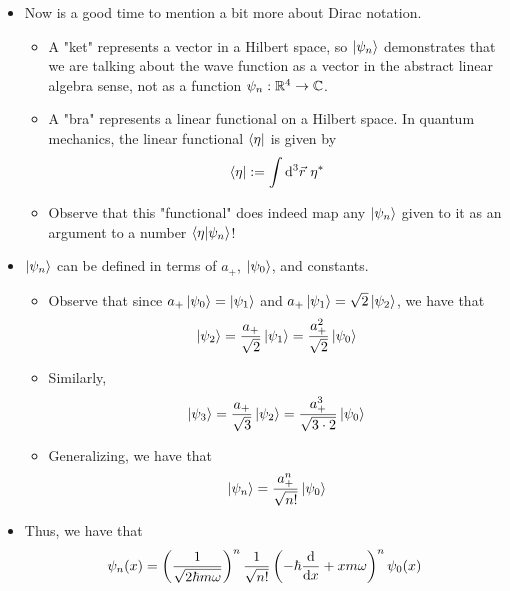 \documentclass[../notes.tex]{subfiles}
\begin{document}
\begin{itemize}
\begin{itemize}
    \end{itemize}
    \item Now is a good time to mention a bit more about Dirac notation.
    \begin{itemize}
        \item A "ket" represents a vector in a Hilbert space, so $\ket{\psi_n}$ demonstrates that we are talking about the wave function as a vector in the abstract linear algebra sense, not as a function $\psi_n:\mathbb{R}^4\to\mathbb{C}$.
        \item A "bra" represents a linear functional on a Hilbert space. In quantum mechanics, the linear functional $\bra{\eta}$ is given by
        \begin{equation*}
            \bra{\eta} := \int\dd^3\vec{r}\ \eta^*
        \end{equation*}
        \item Observe that this "functional" does indeed map any $\ket{\psi_n}$ given to it as an argument to a number $\braket{\eta}{\psi_n}$!
    \end{itemize}
    \item $\ket{\psi_n}$ can be defined in terms of $a_+$, $\ket{\psi_0}$, and constants.
    \begin{itemize}
        \item Observe that since $a_+\ket{\psi_0}=\ket{\psi_1}$ and $a_+\ket{\psi_1}=\sqrt{2}\ket{\psi_2}$, we have that
        \begin{equation*}
            \ket{\psi_2} = \frac{a_+}{\sqrt{2}}\ket{\psi_1}
            = \frac{a_+^2}{\sqrt{2}}\ket{\psi_0}
        \end{equation*}
        \item Similarly,
        \begin{equation*}
            \ket{\psi_3} = \frac{a_+}{\sqrt{3}}\ket{\psi_2}
            = \frac{a_+^3}{\sqrt{3\cdot 2}}\ket{\psi_0}
        \end{equation*}
        \item Generalizing, we have that
        \begin{equation*}
            \ket{\psi_n} = \frac{a_+^n}{\sqrt{n!}}\ket{\psi_0}
        \end{equation*}
    \end{itemize}
    \item Thus, we have that
    \begin{equation*}
        \psi_n(x) = \left( \frac{1}{\sqrt{2\hbar m\omega}} \right)^n\frac{1}{\sqrt{n!}}\left( -\hbar\dv{x}+xm\omega \right)^n\psi_0(x)

\end{equation*}
\end{itemize}
\end{document}
